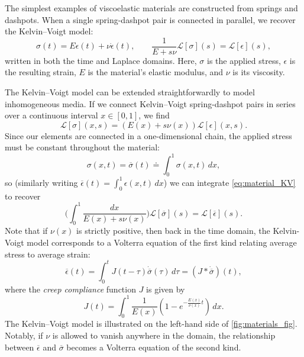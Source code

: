 \documentclass{cams-l} %
\newcommand{\cL}{\mathcal L}
\newcommand{\ovl}[1]{{\overline{#1}}}
\theoremstyle{definition}
\theoremstyle{remark}
\numberwithin{equation}{section}
\begin{document}
The simplest examples of viscoelastic materials are constructed from springs and dashpots. When a single spring-dashpot pair is connected in parallel, we recover the Kelvin--Voigt model:
\[\sigma(t) = E\epsilon(t) + \nu\dot{\epsilon}(t),\qquad \frac{1}{E+s\nu}\cL[\sigma](s) = \cL[\epsilon](s),\]
written in both the time and Laplace domains. Here, $\sigma$ is the applied stress, $\epsilon$ is the resulting strain, $E$ is the material's elastic modulus, and $\nu$ is its viscosity. 

The Kelvin--Voigt model can be extended straightforwardly to model inhomogeneous media. If we connect Kelvin--Voigt spring-dashpot pairs in series over a continuous interval $x\in[0,1]$, we find
\begin{equation}\label{eq:material_KV}
    \cL[\sigma](x, s) = (E(x) + s\nu(x))\cL[\epsilon](x, s).
\end{equation}
Since our elements are connected in a one-dimensional chain, the applied stress must be constant throughout the material:
\[\sigma(x,t) = \overline{\sigma}(t) \doteq \int_0^1\sigma(x,t)\,dx,\]
so (similarly writing $\overline{\epsilon}(t) = \int_0^1\epsilon(x,t)\,dx$) we can integrate \cref{eq:material_KV} to recover
\begin{equation}\label{eq:KV_laplace}
    \Big(\int_0^1\frac{dx}{E(x) + s\nu(x)}\Big)\cL[\overline{\sigma}](s) = \cL[\overline{\epsilon}](s).
\end{equation}
Note that if $\nu(x)$ is strictly positive, then back in the time domain, the Kelvin-Voigt model corresponds to a {Volterra equation of the first kind} relating average stress to average strain:
\[\ovl{\epsilon}(t) = \int_0^t J(t-\tau)\dot{\ovl{\sigma}}(\tau)\,d\tau = (J*\dot{\ovl{\sigma}})(t),\]
where the \emph{creep compliance} function $J$ is given by
\[J(t) = \int_0^1\frac{1}{E(x)}\left(1 - e^{-\frac{E(x)}{\nu(x)}t}\right)\,dx.\]
The Kelvin--Voigt model is illustrated on the left-hand side of \cref{fig:materials_fig}. Notably, if $\nu$ is allowed to vanish anywhere in the domain, the relationship between $\ovl{\epsilon}$ and $\ovl{\sigma}$ becomes a {Volterra equation of the second kind}.
\end{document}
